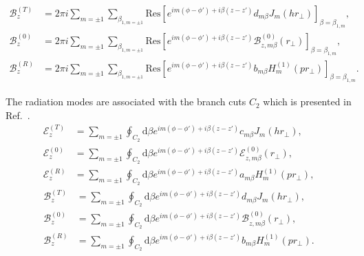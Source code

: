 \documentclass[]{report}
\begin{document}
\begin{subequations}\label{BT0RRes}
\begin{align}
\mathcal{B}^{(T)}_z &= 2\pi i \sum_{m=\pm 1} \sum_{\beta_{1,m=\pm 1}}\mathrm{Res}\left[ e^{im(\phi\!-\!\phi') + i\beta (z\!-\!z')} d_{m\beta} J_m (hr\!_\perp)\right]_{\beta=\beta_{1,m}},\\
\mathcal{B}^{(0)}_{z} &= 2\pi i \sum_{m=\pm 1} \sum_{\beta_{1,m=\pm 1}}\mathrm{Res}\left[  e^{im(\phi-\phi') + i\beta (z-z')} \mathcal{B}^{(0)}_{z,m\beta}(r\!_\perp)\right]_{\beta=\beta_{1,m}}, \\
\mathcal{B}^{(R)}_z &= 2\pi i \sum_{m=\pm 1} \sum_{\beta_{1,m=\pm 1}}\mathrm{Res}\left[ e^{im(\phi\!-\!\phi') + i\beta (z\!-\!z')} b_{m\beta} H_m^{(1)} (pr\!_\perp)\right]_{\beta=\beta_{1,m}}.
\end{align}
\end{subequations}

The radiation modes are associated with the branch cuts $ C_2 $ which is presented in Ref.~\cite{Klimov2004}.
\begin{subequations}\label{ET0RC2}
\begin{align}
\mathcal{E}^{(T)}_z &= \sum_{m=\pm 1} \oint_{C_2} \mathrm{d}\beta e^{im(\phi-\phi') + i\beta (z-z')} c_{m\beta} J_m (hr\!_\perp),\\
\mathcal{E}^{(0)}_{z} &= \sum_{m=\pm 1} \oint_{C_2} \mathrm{d}\beta e^{im(\phi-\phi') + i\beta (z-z')} \mathcal{E}^{(0)}_{z,m\beta}(r\!_\perp),\\
\mathcal{E}^{(R)}_z &= \sum_{m=\pm 1} \oint_{C_2} \mathrm{d}\beta e^{im(\phi-\phi') + i\beta (z-z')} a_{m\beta} H_m^{(1)} (pr\!_\perp),
\end{align}
\end{subequations}
\begin{subequations}\label{BT0RC2}
\begin{align}
\mathcal{B}^{(T)}_z &= \sum_{m=\pm 1} \oint_{C_2} \mathrm{d}\beta e^{im(\phi-\phi') + i\beta (z-z')} d_{m\beta} J_m (hr\!_\perp),\\
\mathcal{B}^{(0)}_{z} &= \sum_{m=\pm 1} \oint_{C_2} \mathrm{d}\beta e^{im(\phi-\phi') + i\beta (z-z')} \mathcal{B}^{(0)}_{z,m\beta}(r\!_\perp),\\
\mathcal{B}^{(R)}_z &= \sum_{m=\pm 1} \oint_{C_2} \mathrm{d}\beta e^{im(\phi-\phi') + i\beta (z-z')} b_{m\beta} H_m^{(1)} (pr\!_\perp).
\end{align}
\end{subequations}
\end{document}

